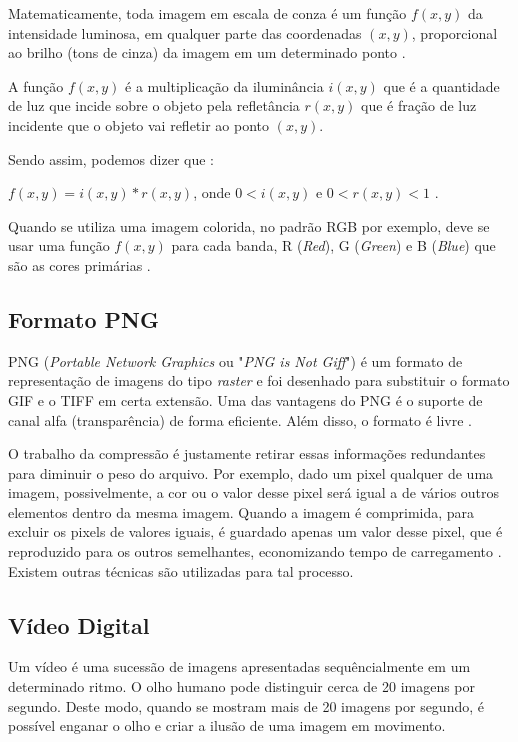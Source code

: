 Matematicamente, toda imagem em escala de conza é um função $f(x,y)$ da intensidade luminosa, em qualquer parte das coordenadas $(x,y)$, proporcional ao brilho (tons de cinza) da imagem em um determinado ponto \cite{gonzalez_woods}. 

A função  $f(x,y)$  é a multiplicação da iluminância  $i(x,y)$ que é a quantidade de luz que incide sobre o objeto pela refletância  $r(x,y)$  que é fração de luz incidente que o objeto vai refletir ao ponto $(x,y)$. 

Sendo assim, podemos dizer que :

$f(x,y) = i(x,y) * r(x,y)$,
onde $0 < i(x,y)$ e $0 < r(x,y) < 1$ .

Quando se utiliza uma imagem colorida, no padrão RGB por exemplo,  deve se usar uma função $f(x,y)$ para cada banda, R (\textit{Red}), G (\textit{Green}) e B (\textit{Blue}) que são as cores primárias \cite{gonzalez_woods}.

 
\subsection{Formato PNG}\label{subsec:png}

PNG (\textit{Portable Network Graphics} ou "\textit{PNG is Not Giff}") é um formato de representação de imagens do tipo \textit{raster} e foi desenhado para substituir o formato GIF e o TIFF em certa extensão. Uma das vantagens do PNG é o suporte de canal alfa (transparência) de forma eficiente. Além disso, o formato é livre \cite{png}. 

O trabalho da compressão é justamente retirar essas informações redundantes para diminuir o peso do arquivo. Por exemplo, dado um pixel qualquer de uma imagem, possivelmente, a cor ou o valor desse pixel será igual a de vários outros elementos dentro da mesma imagem. Quando a imagem é comprimida, para excluir os pixels de valores iguais, é guardado apenas um valor desse pixel, que é reproduzido para os outros semelhantes, economizando tempo de carregamento \cite{img_compact}. Existem outras técnicas são utilizadas para tal processo.

 \subsection{Vídeo Digital}\label{subsec:videodigi}
 
 Um vídeo é uma sucessão de imagens apresentadas sequêncialmente em um determinado ritmo. O olho humano pode distinguir cerca de 20 imagens por segundo. Deste modo, quando se mostram mais de 20 imagens por segundo, é possível enganar o olho e criar a ilusão de uma imagem em movimento. 
 
